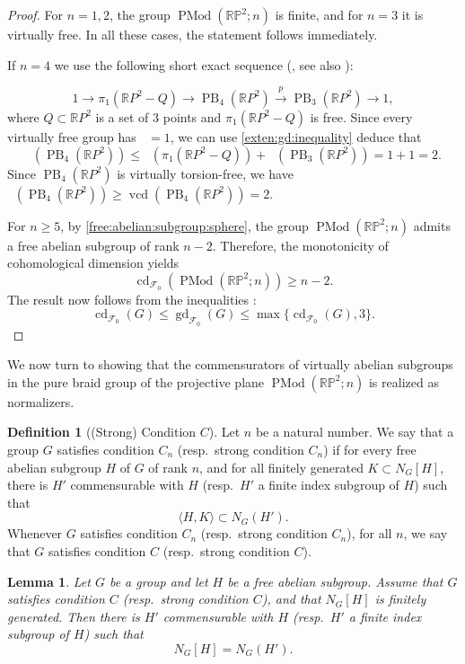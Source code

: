 \documentclass[a4paper,12pt,leqno]{amsart}
\newtheorem{lemma}[theorem]{Lemma}
\theoremstyle{definition}
\newtheorem{definition}[theorem]{Definition}
\newcommand{\calF}{{\mathcal F}}
\DeclareMathOperator{\cd}{cd}
\DeclareMathOperator{\vcd}{vcd}
\DeclareMathOperator{\gd}{gd}
\DeclareMathOperator{\gdfin}{gd_{\calF_0}}
\DeclareMathOperator{\pmcg}{PMod}
\DeclareMathOperator{\pb}{PB}
\begin{document}
\begin{proof}
    For $n = 1, 2$, the group $\pmcg(\mathbb{RP}^2; n)$ is finite, and for $n = 3$ it is virtually free. 
    In all these cases, the statement follows immediately. 

    If $n=4$ we use the following short exact sequence (\cite{Fadell1962}, see also \cite{GG2010}):

    \[
1 \longrightarrow \pi_1(\mathbb{R}P^2-Q) \longrightarrow \pb_{4}(\mathbb{R}P^2) \xrightarrow{\;p\;} \pb_3(\mathbb{R}P^2) \longrightarrow 1, \tag{$*$}
\]
where $Q\subset\mathbb{R}P^2$ is a set of $3$ points and $\pi_1(\mathbb{R}P^2-Q)$ is free. Since every virtually free group has $\gdfin=1$, we can use \cref{exten:gd:inequality} deduce that 
$$\gdfin(\pb_{4}(\mathbb{R}P^2))\leq \gdfin(\pi_1(\mathbb{R}P^2-Q))+ \gdfin(\pb_3(\mathbb{R}P^2))=1+1=2.$$
Since $\pb_{4}(\mathbb{R}P^2)$ is virtually torsion-free, we have $\gdfin(\pb_{4}(\mathbb{R}P^2))\geq \vcd(\pb_{4}(\mathbb{R}P^2))=2$. 


    For $n \geq 5$, by \cref{free:abelian:subgroup:sphere}, the group $\pmcg(\mathbb{RP}^2; n)$ admits a free abelian subgroup of rank $n-2$. 
    Therefore, the monotonicity of cohomological dimension yields
    \[
    \cd_{\calF_0}(\pmcg(\mathbb{RP}^2; n)) \geq n - 2.
    \]
    The result now follows from the inequalities \cite[Theorem 0.1]{LM00}:
    \[
    \cd_{\calF_0}(G) \leq \gd_{\calF_0}(G) \leq \max\{\cd_{\calF_0}(G), 3\}.
    \]
\end{proof}

We now turn to showing that the commensurators of virtually abelian subgroups in the pure braid group of the projective plane $\pmcg(\mathbb{RP}^2; n)$ is realized as normalizers.

\begin{definition}[(Strong) Condition $C$]
Let $n$ be a natural number. We say that a group $G$ satisfies condition
$C_n$ (resp.\ strong condition $C_n$) if for every free abelian subgroup
$H$ of $G$ of rank $n$, and for all finitely generated
$K \subset N_G[H]$, there is $H'$ commensurable with $H$
(resp.\ $H'$ a finite index subgroup of $H$) such that
\[
\langle H,K\rangle \subset N_G(H').
\]
Whenever $G$ satisfies condition $C_n$
(resp.\ strong condition $C_n$), for all $n$, we say that
$G$ satisfies condition $C$ (resp.\ strong condition $C$).
\end{definition}

\begin{lemma}\label{comm:equal:normalizer}
Let $G$ be a group and let $H$ be a free abelian subgroup.
Assume that $G$ satisfies condition $C$
(resp.\ strong condition $C$), and that $N_G[H]$
is finitely generated. Then there is $H'$
commensurable with $H$
(resp.\ $H'$ a finite index subgroup of $H$)
such that
\[
N_G[H]=N_G(H').
\]
\end{lemma}
\end{document}
